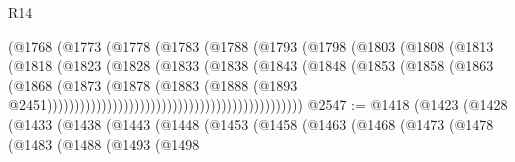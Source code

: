 \begin{lexlean}{R14}
\begin{coremodule}
                                              (@1768
                                                (@1773
                                                  (@1778
                                                    (@1783
                                                      (@1788
                                                        (@1793
                                                          (@1798
                                                            (@1803
                                                              (@1808
                                                                (@1813
                                                                  (@1818
                                                                    (@1823
                                                                      (@1828
                                                                        (@1833
                                                                          (@1838
                                                                            (@1843
                                                                              (@1848
                                                                                (@1853
                                                                                  (@1858
                                                                                    (@1863
                                                                                      (@1868
                                                                                        (@1873
                                                                                          (@1878
                                                                                            (@1883
                                                                                              (@1888
                                                                                                (@1893
                                                                                                  @2451)))))))))))))))))))))))))))))))))))))))))))))))
@2547 := @1418
    (@1423
      (@1428
        (@1433
          (@1438
            (@1443
              (@1448
                (@1453
                  (@1458
                    (@1463
                      (@1468
                        (@1473
                          (@1478
                            (@1483
                              (@1488
                                (@1493
                                  (@1498

\end{coremodule}
\end{lexlean}
